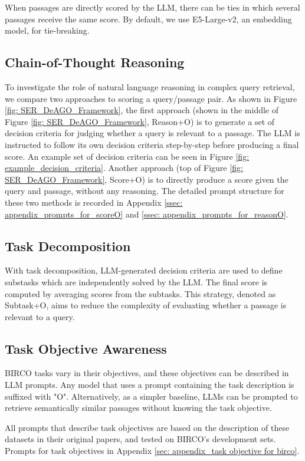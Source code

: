 \documentclass[11pt]{article}
\begin{document}
When passages are directly scored by the LLM, there can be ties in which several passages receive the same score. By default, we use E5-Large-v2, an embedding model, for tie-breaking. 

\subsection{Chain-of-Thought Reasoning}
To investigate the role of natural language reasoning in complex query retrieval, we compare two approaches to scoring a query/passage pair. As shown in Figure \ref{fig: SER_DeAGO_Framework}, the first approach (shown in the middle of Figure \ref{fig: SER_DeAGO_Framework}, Reason+O) is to generate a set of decision criteria for judging whether a query is relevant to a passage. The LLM is instructed to follow its own decision criteria step-by-step before producing a final score. An example set of decision criteria can be seen in Figure \ref{fig: example_decision_criteria}.
Another approach (top of Figure \ref{fig: SER_DeAGO_Framework}, Score+O) is to directly produce a score given the query and passage, without any reasoning. The detailed prompt structure for these two methods is recorded in Appendix \ref{ssec: appendix_prompts_for_scoreO} and \ref{ssec: appendix_prompts_for_reasonO}.

\subsection{Task Decomposition}
With task decomposition, LLM-generated decision criteria are used to define substasks which are independently solved by the LLM. The final score is computed by averaging scores from the subtasks. This strategy, denoted as Subtask+O, aims to reduce the complexity of evaluating whether a passage is relevant to a query.

\subsection{Task Objective Awareness}
BIRCO tasks vary in their objectives, and these objectives can be described in LLM prompts. Any model that uses a prompt containing the task description is suffixed with "O". Alternatively, as a simpler baseline, LLMs can be prompted to retrieve semantically similar passages without knowing the task objective. 

All prompts that describe task objectives are based on the description of these datasets in their original papers, and tested on BIRCO's development sets. Prompts for task objectives in Appendix \ref{sec: appendix_task objective for birco}. 
\end{document}
